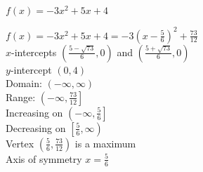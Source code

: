 {$f(x) = -3x^2+5x+4$}
{$f(x) = -3x^2+5x+4 = -3\left(x-\frac{5}{6}\right)^2 + \frac{73}{12}$\\
$x$-intercepts {\small $\left(\frac{5 - \sqrt{73}}{6}, 0\right)$ and $\left(\frac{5+\sqrt{73}}{6}, 0\right)$}\\
$y$-intercept $(0, 4)$\\
Domain: $(-\infty, \infty)$ \\
Range: $\left(-\infty,  \frac{73}{12} \right]$ \\
Increasing on $\left(-\infty, \frac{5}{6}\right]$ \\
Decreasing on $\left[ \frac{5}{6}, \infty\right)$ \\
Vertex $\left(\frac{5}{6}, \frac{73}{12} \right)$ is a maximum \\
Axis of symmetry $x = \frac{5}{6}$

\begin{center}
\end{center}
}